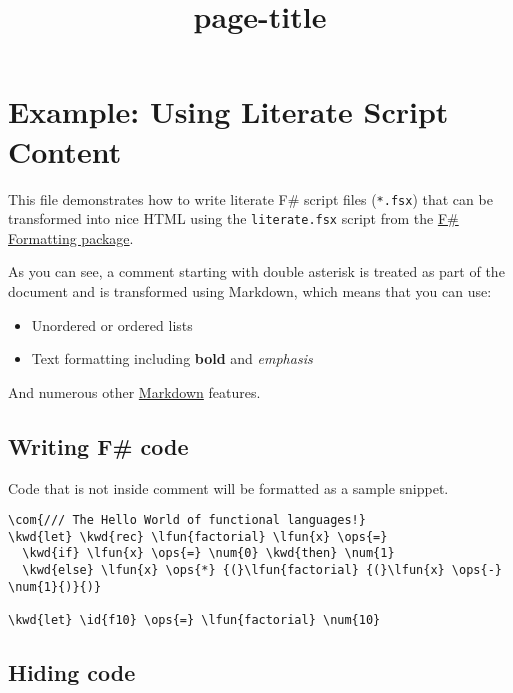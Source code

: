 \documentclass{article}
\title{{page-title}}
\date{}
\newcommand{\id}[1]{\textcolor{black}{#1}}
\newcommand{\com}[1]{\textcolor{officegreen}{#1}}
\newcommand{\kwd}[1]{\textcolor{navy}{#1}}
\newcommand{\num}[1]{\textcolor{officegreen}{#1}}
\newcommand{\ops}[1]{\textcolor{purple}{#1}}
\begin{document}
\maketitle


\section*{Example: Using Literate Script Content}



This file demonstrates how to write literate F\# script
files (\texttt{*.fsx}) that can be transformed into nice HTML
using the \texttt{literate.fsx} script from the \href{http://fsprojects.github.io/FSharp.Formatting}{F\# Formatting
package}.


As you can see, a comment starting with double asterisk
is treated as part of the document and is transformed
using Markdown, which means that you can use:
\begin{itemize}
\item Unordered or ordered lists

\item Text formatting including \textbf{bold} and \emph{emphasis}

\end{itemize}



And numerous other \href{http://daringfireball.net/projects/markdown}{Markdown} features.
\subsection*{Writing F\# code}



Code that is not inside comment will be formatted as
a sample snippet.
\begin{Verbatim}[commandchars=\\\{\}]
\com{/// The Hello World of functional languages!}
\kwd{let} \kwd{rec} \lfun{factorial} \lfun{x} \ops{=} 
  \kwd{if} \lfun{x} \ops{=} \num{0} \kwd{then} \num{1} 
  \kwd{else} \lfun{x} \ops{*} {(}\lfun{factorial} {(}\lfun{x} \ops{-} \num{1}{)}{)}

\kwd{let} \id{f10} \ops{=} \lfun{factorial} \num{10}
\end{Verbatim}

\subsection*{Hiding code}
\end{document}
